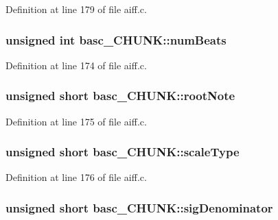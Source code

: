 Definition at line 179 of file aiff.\+c.

\subsubsection[{\texorpdfstring{num\+Beats}{numBeats}}]{\setlength{\rightskip}{0pt plus 5cm}unsigned {\bf int} basc\+\_\+\+C\+H\+U\+N\+K\+::num\+Beats}\hypertarget{structbasc___c_h_u_n_k_aceb2b8716e6feca9610fab852697de66}{}\label{structbasc___c_h_u_n_k_aceb2b8716e6feca9610fab852697de66}


Definition at line 174 of file aiff.\+c.

\subsubsection[{\texorpdfstring{root\+Note}{rootNote}}]{\setlength{\rightskip}{0pt plus 5cm}unsigned short basc\+\_\+\+C\+H\+U\+N\+K\+::root\+Note}\hypertarget{structbasc___c_h_u_n_k_aaa602d3a4f00e4bb6dc365c2d0eb72ba}{}\label{structbasc___c_h_u_n_k_aaa602d3a4f00e4bb6dc365c2d0eb72ba}


Definition at line 175 of file aiff.\+c.

\subsubsection[{\texorpdfstring{scale\+Type}{scaleType}}]{\setlength{\rightskip}{0pt plus 5cm}unsigned short basc\+\_\+\+C\+H\+U\+N\+K\+::scale\+Type}\hypertarget{structbasc___c_h_u_n_k_ad1611912fcb417ea4ab9c8ba34c0e429}{}\label{structbasc___c_h_u_n_k_ad1611912fcb417ea4ab9c8ba34c0e429}


Definition at line 176 of file aiff.\+c.

\subsubsection[{\texorpdfstring{sig\+Denominator}{sigDenominator}}]{\setlength{\rightskip}{0pt plus 5cm}unsigned short basc\+\_\+\+C\+H\+U\+N\+K\+::sig\+Denominator}\hypertarget{structbasc___c_h_u_n_k_a187a85977f0cb89e02f91898f978523c}{}\label{structbasc___c_h_u_n_k_a187a85977f0cb89e02f91898f978523c}


